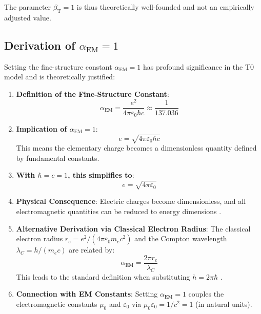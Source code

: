 \documentclass[12pt,a4paper]{article}
\newcommand{\alphaEM}{\alpha_{\text{EM}}}
\newcommand{\betaT}{\beta_{\text{T}}}
\begin{document}
	The parameter $\betaT = 1$ is thus theoretically well-founded and not an empirically adjusted value.
	
	\subsection{Derivation of $\alphaEM = 1$}
	
	Setting the fine-structure constant $\alphaEM = 1$ has profound significance in the T0 model and is theoretically justified:
	
	\begin{enumerate}
		\item \textbf{Definition of the Fine-Structure Constant}:
		\begin{equation}
			\alphaEM = \frac{e^2}{4\pi\varepsilon_0\hbar c} \approx \frac{1}{137.036}
		\end{equation}
		
		\item \textbf{Implication of $\alphaEM = 1$}:
		\begin{equation}
			e = \sqrt{4\pi\varepsilon_0\hbar c}
		\end{equation}
		This means the elementary charge becomes a dimensionless quantity defined by fundamental constants.
		
		\item \textbf{With $\hbar = c = 1$, this simplifies to}:
		\begin{equation}
			e = \sqrt{4\pi\varepsilon_0}
		\end{equation}
		
		\item \textbf{Physical Consequence}:
		Electric charges become dimensionless, and all electromagnetic quantities can be reduced to energy dimensions \cite{pascher_alpha_2025}.
		
		\item \textbf{Alternative Derivation via Classical Electron Radius}:
		The classical electron radius $r_e = e^2/(4\pi\varepsilon_0m_e c^2)$ and the Compton wavelength $\lambda_C = h/(m_e c)$ are related by:
		\begin{equation}
			\alphaEM = \frac{2\pi r_e}{\lambda_C}
		\end{equation}
		This leads to the standard definition when substituting $h = 2\pi\hbar$ \cite{pascher_alpha_2025}.
		
		\item \textbf{Connection with EM Constants}:
		Setting $\alphaEM = 1$ couples the electromagnetic constants $\mu_0$ and $\varepsilon_0$ via $\mu_0\varepsilon_0 = 1/c^2 = 1$ (in natural units).
	\end{enumerate}
	
\end{document}
